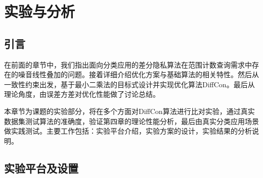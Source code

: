 
\raggedbottom
\chapter{实验与分析}
\label{chap:evaluation}









\section{引言}

在前面的章节中，我们指出面向分类应用的差分隐私算法在范围计数查询需求中存在的噪音线性叠加的问题。接着详细介绍优化方案与基础算法的相关特性。然后从一致性约束出发，基于最小二乘法的目标式设计并实现优化算法DiffCon。最后从理论角度，由误差方差对优化性能做了讨论总结。

本章节为课题的实验部分，将在多个方面对DiffCon算法进行比对实验，通过真实数据集测试算法的准确度，验证第四章的理论性能分析，最后由真实分类应用场景做实践测试。主要工作包括：实验平台介绍，实验方案的设计，实验结果的分析说明。

\section{实验平台及设置}

